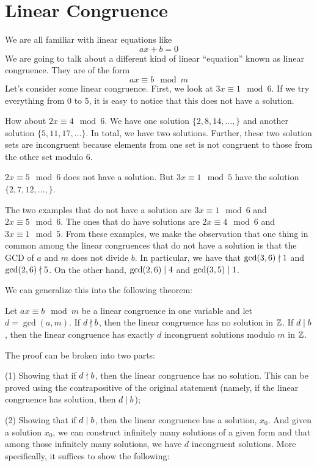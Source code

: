 \section{Linear Congruence}

We are all familiar with linear equations like
$$
ax + b = 0
$$
We are going to talk about a different kind of linear ``equation'' known as linear congruence. They are of the form
$$
ax \equiv b \mod m
$$
Let's consider some linear congruence. First, we look at $3x \equiv 1 \mod 6$. If we try everything from 0 to 5, it is easy to notice that this does not have a solution.

How about $2x \equiv 4 \mod 6$. We have one solution $\{2,8,14,\ldots,\}$ and another solution $\{5,11,17,\ldots\}$. In total, we have two solutions. Further, these two solution sets are incongruent because elements from one set is not congruent to those from the other set modulo $6$.

$2x \equiv 5 \mod 6$ does not have a solution. But $3x \equiv 1 \mod 5$ have the solution $\{2,7,12,\ldots,\}$.

The two examples that do not have a solution are $3x \equiv 1 \mod 6$ and $2x \equiv 5 \mod 6$. The ones that do have solutions are $2x \equiv 4 \mod 6$ and $3x \equiv 1 \mod 5$. From these examples, we make the observation that one thing in common among the linear congruences that do not have a solution is that the GCD of $a$ and $m$ does not divide $b$. In particular, we have that $\gcd(3,6) \mathrel{\nmid} 1$ and $\gcd(2,6) \mathrel{\nmid} 5$. On the other hand, $\gcd(2,6) \mathrel{\mid} 4$ and $\gcd(3,5) \mathrel{\mid} 1$.

We can generalize this into the following theorem:

\begin{theorem} \label{thm:lin-congruence-soln}
    Let $ax \equiv b \mod m$ be a linear congruence in one variable and let $d = \gcd(a,m)$. If $d \mathrel{\nmid} b$, then the linear congruence has no solution in $\mathbb{Z}$. If $d \mathrel{\mid} b$, then the linear congruence has exactly $d$ incongruent solutions modulo $m$ in $\mathbb{Z}$.
\end{theorem}

The proof can be broken into two parts: 

(1) Showing that if $d \mathrel{\nmid} b$, then the linear congruence has no solution. This can be proved using the contrapositive of the original statement (namely, if the linear congruence has solution, then $d \mathrel{\mid} b$); 

(2) Showing that if $d \mathrel{\mid} b$, then the linear congruence has a solution, $x_0$. And given a solution $x_0$, we can construct infinitely many solutions of a given form and that among those infinitely many solutions, we have $d$ incongruent solutions. More specifically, it suffices to show the following:

